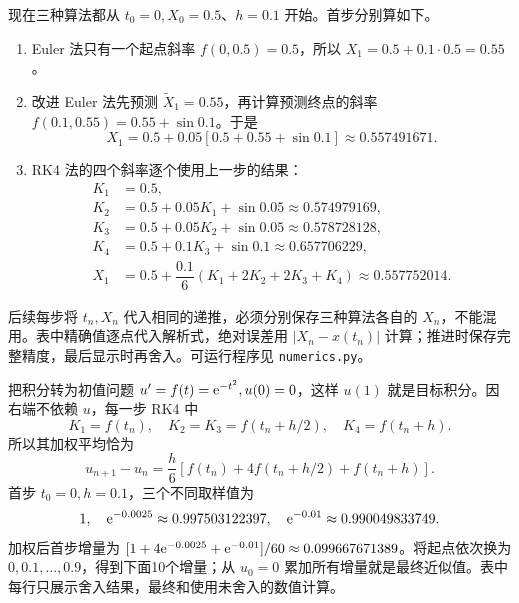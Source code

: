 现在三种算法都从 $t_0=0,X_0=0.5$、$h=0.1$ 开始。首步分别算如下。
\begin{enumerate}
\item Euler 法只有一个起点斜率 $f(0,0.5)=0.5$，所以 $X_1=0.5+0.1\cdot0.5=0.55$。
\item 改进 Euler 法先预测 $\widetilde X_1=0.55$，再计算预测终点的斜率 $f(0.1,0.55)=0.55+\sin0.1$。于是
\[
X_1=0.5+0.05[0.5+0.55+\sin0.1]\approx0.557491671.
\]
\item RK4 法的四个斜率逐个使用上一步的结果：
\[
\begin{aligned}
K_1&=0.5,\\
K_2&=0.5+0.05K_1+\sin0.05\approx0.574979169,\\
K_3&=0.5+0.05K_2+\sin0.05\approx0.578728128,\\
K_4&=0.5+0.1K_3+\sin0.1\approx0.657706229,\\
X_1&=0.5+\dfrac{0.1}{6}(K_1+2K_2+2K_3+K_4)
\approx0.557752014.
\end{aligned}
\]
\end{enumerate}
后续每步将 $t_n,X_n$ 代入相同的递推，必须分别保存三种算法各自的 $X_n$，不能混用。表中精确值逐点代入解析式，绝对误差用 $|X_n-x(t_n)|$ 计算；推进时保存完整精度，最后显示时再舍入。可运行程序见 \texttt{numerics.py}。

把积分转为初值问题 $u'=f(t)=\mathrm e^{-t^2},u(0)=0$，这样 $u(1)$ 就是目标积分。因右端不依赖 $u$，每一步 RK4 中
\[
K_1=f(t_n),\quad K_2=K_3=f(t_n+h/2),\quad K_4=f(t_n+h).
\]
所以其加权平均恰为
\[
u_{n+1}-u_n=\dfrac h6[f(t_n)+4f(t_n+h/2)+f(t_n+h)].
\]
首步 $t_0=0,h=0.1$，三个不同取样值为
\[
1,\quad\mathrm e^{-0.0025}\approx0.997503122397,\quad
\mathrm e^{-0.01}\approx0.990049833749.
\]
加权后首步增量为 $[1+4\mathrm e^{-0.0025}+\mathrm e^{-0.01}]/60\approx0.099667671389$。将起点依次换为 $0,0.1,\ldots,0.9$，得到下面10个增量；从 $u_0=0$ 累加所有增量就是最终近似值。表中每行只展示舍入结果，最终和使用未舍入的数值计算。

